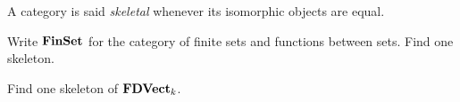 \begin{definition}
A category is said {\em skeletal} whenever its isomorphic objects are equal.
\end{definition}

\begin{exercise}
Write \(\mathbf{FinSet}\) for the category of finite sets and functions between sets. Find one skeleton.
\end{exercise}

\begin{exercise}
Find one skeleton of \(\mathbf{FDVect}_k\).
\end{exercise}

%
%
%
